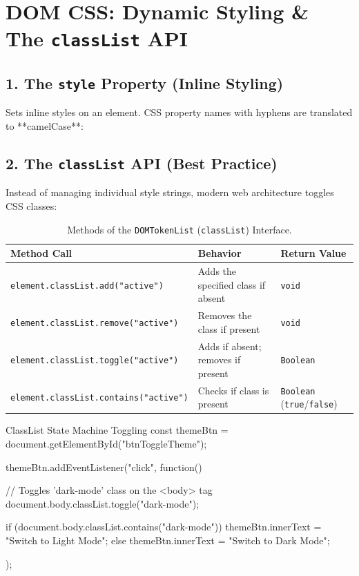 \section{DOM CSS: Dynamic Styling \& The \texttt{classList} API}

\subsection{1. The \texttt{style} Property (Inline Styling)}
Sets inline styles on an element. CSS property names with hyphens are translated to **camelCase**:

\subsection{2. The \texttt{classList} API (Best Practice)}
Instead of managing individual style strings, modern web architecture toggles CSS classes:

\begin{table}[htbp]
\centering
\small
\renewcommand{\arraystretch}{1.3}
\begin{tabularx}{\linewidth}{l>{\raggedright\arraybackslash}Xl}
\toprule
\textbf{Method Call} & \textbf{Behavior} & \textbf{Return Value} \\
\midrule
\texttt{element.classList.add("active")} & Adds the specified class if absent & \texttt{void} \\
\texttt{element.classList.remove("active")} & Removes the class if present & \texttt{void} \\
\texttt{element.classList.toggle("active")} & Adds if absent; removes if present & \texttt{Boolean} \\
\texttt{element.classList.contains("active")} & Checks if class is present & \texttt{Boolean} (\texttt{true}/\texttt{false}) \\
\bottomrule
\end{tabularx}
\caption{Methods of the \texttt{DOMTokenList} (\texttt{classList}) Interface.}
\label{tab:classlist-methods}
\end{table}

\begin{jscode}{ClassList State Machine Toggling}
const themeBtn = document.getElementById("btnToggleTheme");

themeBtn.addEventListener("click", function() {
    // Toggles 'dark-mode' class on the <body> tag
    document.body.classList.toggle("dark-mode");
    
    if (document.body.classList.contains("dark-mode")) {
        themeBtn.innerText = "Switch to Light Mode";
    } else {
        themeBtn.innerText = "Switch to Dark Mode";
    }
});
\end{jscode}

